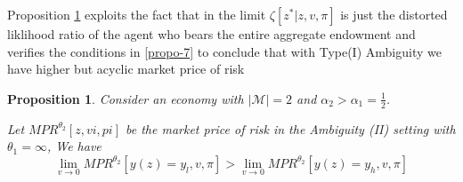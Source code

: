 \documentclass[12pt]{article}
\newtheorem{proposition}{Proposition}
\begin{document}
Proposition \ref{propo-mpr} exploits the fact that in the limit $\zeta[z^*|z,v,\pi]$ is just the distorted liklihood ratio of the agent who bears the entire aggregate endowment and verifies the conditions in \ref{propo-7} to conclude that with Type(I) Ambiguity we have higher but acyclic market price of risk


%
%
%
\begin{proposition}
\label{propo-mpr}
Consider an economy with $|\mathcal{M}|=2$ and $\alpha_2>\alpha_1=\frac{1}{2}$. 

Let $MPR^{\theta_2}[z,vi,pi]$ be the market price of risk in the Ambiguity (II) setting with $\theta_1=\infty$, We have 
\[\lim_{v\to0} MPR^{\theta_2}[y(z)=y_l,v,\pi] >  \lim_{v\to0} MPR^{\theta_2}[y(z)=y_h,v,\pi] \]
\end{proposition}
\end{document}
